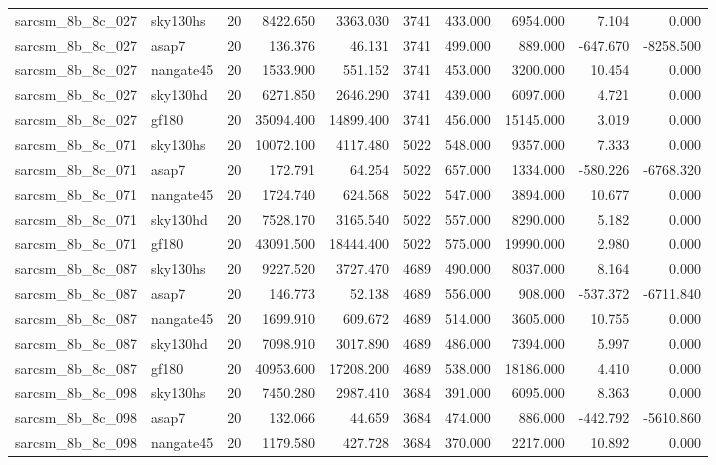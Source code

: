 \begin{longtable}{llrrrrrrrr}
sarcsm\_8b\_8c\_027 & sky130hs & 20 & 8422.650 & 3363.030 & 3741 & 433.000 & 6954.000 & 7.104 & 0.000 \\
sarcsm\_8b\_8c\_027 & asap7 & 20 & 136.376 & 46.131 & 3741 & 499.000 & 889.000 & -647.670 & -8258.500 \\
sarcsm\_8b\_8c\_027 & nangate45 & 20 & 1533.900 & 551.152 & 3741 & 453.000 & 3200.000 & 10.454 & 0.000 \\
sarcsm\_8b\_8c\_027 & sky130hd & 20 & 6271.850 & 2646.290 & 3741 & 439.000 & 6097.000 & 4.721 & 0.000 \\
sarcsm\_8b\_8c\_027 & gf180 & 20 & 35094.400 & 14899.400 & 3741 & 456.000 & 15145.000 & 3.019 & 0.000 \\
sarcsm\_8b\_8c\_071 & sky130hs & 20 & 10072.100 & 4117.480 & 5022 & 548.000 & 9357.000 & 7.333 & 0.000 \\
sarcsm\_8b\_8c\_071 & asap7 & 20 & 172.791 & 64.254 & 5022 & 657.000 & 1334.000 & -580.226 & -6768.320 \\
sarcsm\_8b\_8c\_071 & nangate45 & 20 & 1724.740 & 624.568 & 5022 & 547.000 & 3894.000 & 10.677 & 0.000 \\
sarcsm\_8b\_8c\_071 & sky130hd & 20 & 7528.170 & 3165.540 & 5022 & 557.000 & 8290.000 & 5.182 & 0.000 \\
sarcsm\_8b\_8c\_071 & gf180 & 20 & 43091.500 & 18444.400 & 5022 & 575.000 & 19990.000 & 2.980 & 0.000 \\
sarcsm\_8b\_8c\_087 & sky130hs & 20 & 9227.520 & 3727.470 & 4689 & 490.000 & 8037.000 & 8.164 & 0.000 \\
sarcsm\_8b\_8c\_087 & asap7 & 20 & 146.773 & 52.138 & 4689 & 556.000 & 908.000 & -537.372 & -6711.840 \\
sarcsm\_8b\_8c\_087 & nangate45 & 20 & 1699.910 & 609.672 & 4689 & 514.000 & 3605.000 & 10.755 & 0.000 \\
sarcsm\_8b\_8c\_087 & sky130hd & 20 & 7098.910 & 3017.890 & 4689 & 486.000 & 7394.000 & 5.997 & 0.000 \\
sarcsm\_8b\_8c\_087 & gf180 & 20 & 40953.600 & 17208.200 & 4689 & 538.000 & 18186.000 & 4.410 & 0.000 \\
sarcsm\_8b\_8c\_098 & sky130hs & 20 & 7450.280 & 2987.410 & 3684 & 391.000 & 6095.000 & 8.363 & 0.000 \\
sarcsm\_8b\_8c\_098 & asap7 & 20 & 132.066 & 44.659 & 3684 & 474.000 & 886.000 & -442.792 & -5610.860 \\
sarcsm\_8b\_8c\_098 & nangate45 & 20 & 1179.580 & 427.728 & 3684 & 370.000 & 2217.000 & 10.892 & 0.000 \\

\end{longtable}
